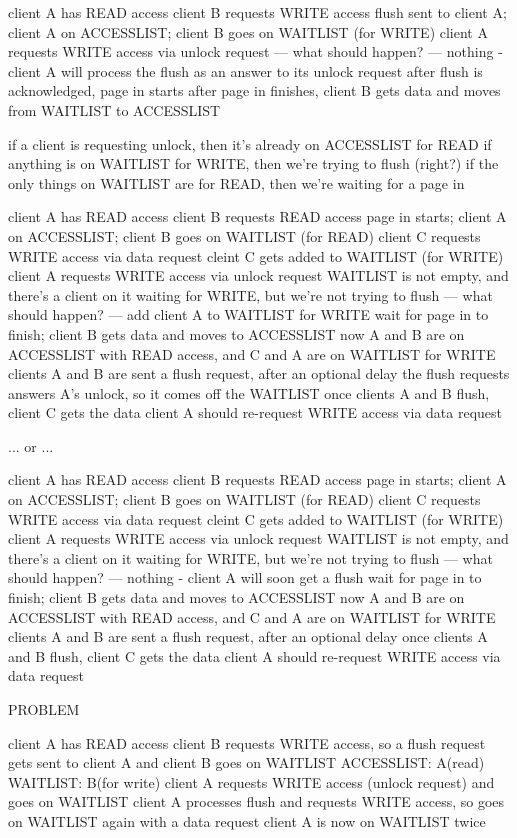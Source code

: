 \documentclass{article}
\begin{document}
client A has READ access
client B requests WRITE access
flush sent to client A; client A on ACCESSLIST; client B goes on WAITLIST (for WRITE)
client A requests WRITE access via unlock request
--- what should happen? ---
nothing - client A will process the flush as an answer to its unlock request
after flush is acknowledged, page in starts
after page in finishes, client B gets data and moves from WAITLIST to ACCESSLIST

if a client is requesting unlock, then it's already on ACCESSLIST for READ
if anything is on WAITLIST for WRITE, then we're trying to flush  (right?)
if the only things on WAITLIST are for READ, then we're waiting for a page in

client A has READ access
client B requests READ access
page in starts; client A on ACCESSLIST; client B goes on WAITLIST (for READ)
client C requests WRITE access via data request
cleint C gets added to WAITLIST (for WRITE)
client A requests WRITE access via unlock request
WAITLIST is not empty, and there's a client on it waiting for WRITE, but we're not trying to flush
--- what should happen? ---
add client A to WAITLIST for WRITE
wait for page in to finish; client B gets data and moves to ACCESSLIST
now A and B are on ACCESSLIST with READ access, and C and A are on WAITLIST for WRITE
clients A and B are sent a flush request, after an optional delay
the flush requests answers A's unlock, so it comes off the WAITLIST
once clients A and B flush, client C gets the data
client A should re-request WRITE access via data request

... or ...

client A has READ access
client B requests READ access
page in starts; client A on ACCESSLIST; client B goes on WAITLIST (for READ)
client C requests WRITE access via data request
cleint C gets added to WAITLIST (for WRITE)
client A requests WRITE access via unlock request
WAITLIST is not empty, and there's a client on it waiting for WRITE, but we're not trying to flush
--- what should happen? ---
nothing - client A will soon get a flush
wait for page in to finish; client B gets data and moves to ACCESSLIST
now A and B are on ACCESSLIST with READ access, and C and A are on WAITLIST for WRITE
clients A and B are sent a flush request, after an optional delay
once clients A and B flush, client C gets the data
client A should re-request WRITE access via data request


PROBLEM

client A has READ access
client B requests WRITE access, so a flush request gets sent to client A and client B goes on WAITLIST
   ACCESSLIST: A(read)   WAITLIST: B(for write)
client A requests WRITE access (unlock request) and goes on WAITLIST
client A processes flush and requests WRITE access, so goes on WAITLIST again with a data request
client A is now on WAITLIST twice
\end{document}
